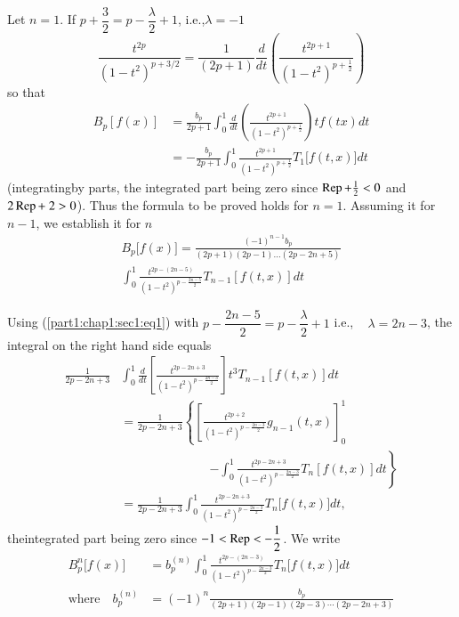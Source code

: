 Let \qquad $n = 1$. If $p  + \dfrac{3}{2} = p - \dfrac{\lambda}{2}+1$,
\quad i.e.,\quad  $\lambda = - 1$ 
$$
\frac{t^{2 p}}{(1 - t^2)^{p + 3 /2}} = \frac{1}{(2 p +1)} \frac{d}{dt}
\left(\frac{t^{ 2 p +1}}{(1 - t^2)^{ p + \frac{1}{2}}}\right) 
$$
so that 
\begin{align*}
  B_p [ f(x) ] & =  \frac{ b_p}{ 2 p + 1} \int^1_0 \frac{d }{dt} \left(\frac{
    t^{2 p + 1}}{ (1 - t^2)^{p + \frac{1}{2}}}\right) t f (tx)dt\\ 
  & = -\frac{b_p}{2p+1} \int^1_0 \frac{t^{2p+1}}{(1-t^2)^{p + \frac{1}{2}}}
  T_1 \big[ f(t, x) \big ] dt 
\end{align*}
(integrating\pageoriginale by parts, the integrated part being zero since $\operatorname{Rep}+
\frac{1}{2} < 0$ and $2\operatorname{Rep} + ~ 2 > 0$). Thus the formula to be
proved holds for  $n=1$. Assuming it for $n-1$, we establish it for
$n$ 
\begin{multline*}
  B_p \big[ f(x) \big] = \frac{(-1)^{n-1}b_p}{(2p + 1)(2p - 1) \ldots
  (2p-2n+5)}\\ 
  \int^1_0 \frac{t^{2p-(2n-5)}}{(1-t^2)^{p-\frac{2n-5}{2}}}
  T_{n-1} [f(t, x)] dt  
\end{multline*}

Using (\ref{part1:chap1:sec1:eq1}) with $p-\dfrac{2n-5}{2} = p- \dfrac{\lambda}{2} + 1$
i.e., ~ $\lambda = 2n-3$, the integral on the right hand side equals 
\begin{align*}
  \frac{1}{2p-2n+3} & \int^1_0 \frac{d}{dt} \left[
    \frac{t^{2p-2n+3}}{(1-t^2)^{p- \frac{2n-3}{2}}} \right] t^3
  T_{n-1} [f(t, x)] dt \\ 
  &= \frac{1}{2p-2n+3} \left\{ \left[ \frac{t^{2p+2}}{(1-t^2)^{p-
        \frac{2n-3}{2}}} g_{n-1} (t, x) \right]^1_0\right.\\ 
  & \hspace{3cm}\left. -\int^1_0
  \frac{t^{2p-2n+3}}{(1-t^2)^{p- \frac{2n-3}{2}}}  T_n \left[ f(t, x)
    \right] dt \right \} \\ 
  &= \frac{1}{2p-2n+3} \int^1_0 \frac{t^{2p-2n+3}}{(1-t^2)^{p-
      \frac{2n-3}{2}}} T_n  \big[ f(t, x) \big] dt, 
\end{align*}
the\pageoriginale integrated part being zero since $-1 < \operatorname{Rep} < - \dfrac{1}{2}$. We write 
\begin{align*}
  B^n_p \big[ f(x)\big] & = b^{(n)}_p \int^1_0
  \frac{t^{2p-(2n-3)}}{(1-t^2)^{p- \frac{2n-3}{2}}} T_n  \big[ f(t, x)
    \big] dt \tag{2}\label{part1:chap3:sec2:eq2} \\
  \text{where}\quad  
  b^{(n)}_p & = (-1)^n  \frac{b_p}{(2p+1) (2p-1) (2p-3) \cdots
    (2p-2n+3)} \tag{3}\label{part1:chap3:sec2:eq3}
\end{align*}

